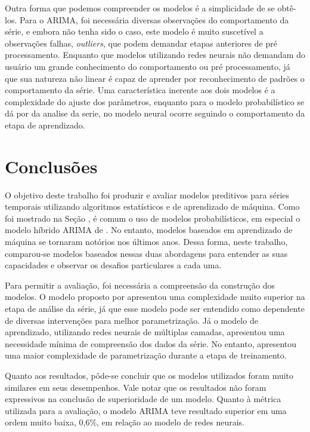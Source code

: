 \documentclass[
    12pt,
    oneside,
    a4paper,
    english,
    brazil
]{abntex2}
\begin{document}
Outra  forma  que  podemos  compreender  os modelos  é  a  simplicidade  de  se
obtê-los. Para o ARIMA, foi necessária diversas observações do comportamento da
série,  e embora  não tenha  sido  o caso,  este  modelo é  muito suscetível  a
observações falhas, \textit{outliers}, que  podem demandar etapas anteriores de
pré processamento. Enquanto  que modelos utilizando redes  neurais não demandam
do usuário um grande conhecimento do comportamento ou pré processamento, já que
sua natureza  não linear é  capaz de aprender  por reconhecimento de  padrões o
comportamento  da série.  Uma  característica  inerente aos  dois  modelos é  a
complexidade do ajuste dos parâmetros, enquanto para o modelo probabilístico se
dá por da analise da serie, no modelo neural ocorre seguindo o comportamento da
etapa de aprendizado.

\chapter{Conclusões}\label{chap:concl}

O objetivo deste trabalho foi produzir e avaliar modelos preditivos para séries
temporais utilizando algoritmos estatísticos e  de aprendizado de máquina. Como
foi mostrado na Seção \label{chap:trab_relacionados},  é comum o uso de modelos
probabilísticos, em  especial o  modelo híbrido  ARIMA de  . No
entanto, modelos  baseados em aprendizado  de máquina se tornaram  notórios nos
últimos anos. Dessa forma, neste  trabalho, comparou-se modelos baseados nessas
duas  abordagens para  entender  as  suas capacidades  e  observar os  desafios
particulares a cada uma.

Para  permitir a  avaliação, foi  necessária  a compreensão  da construção  dos
modelos.  O modelo  proposto por   apresentou  uma complexidade
muito  superior na  etapa de  análise da  série, já  que esse  modelo pode  ser
entendido como dependente de  diversas intervenções para melhor parametrização.
Já  o modelo  de aprendizado,  utilizando redes  neurais de  múltiplas camadas,
apresentou  uma  necessidade mínima  de  compreensão  dos  dados da  série.  No
entanto, apresentou uma maior complexidade de parametrização durante a etapa de
treinamento.

Quanto aos resultados,  pôde-se concluir que os modelos  utilizados foram muito
similares  em  seus  desempenhos.  Vale  notar  que  os  resultados  não  foram
expressivos  na conclusão  de  superioridade  de um  modelo.  Quanto à  métrica
utilizada para a avaliação, o modelo ARIMA teve resultado superior em uma ordem
muito baixa, 0,6\%, em relação ao modelo de redes neurais.
\end{document}
